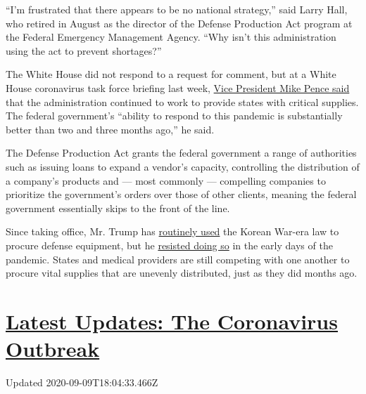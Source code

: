 ``I'm frustrated that there appears to be no national strategy,'' said
Larry Hall, who retired in August as the director of the Defense
Production Act program at the Federal Emergency Management Agency. ``Why
isn't this administration using the act to prevent shortages?''

The White House did not respond to a request for comment, but at a White
House coronavirus task force briefing last week,
\href{https://www.whitehouse.gov/briefings-statements/press-briefing-vice-president-pence-members-white-house-coronavirus-task-force-baton-rouge-la/}{Vice
President Mike Pence said} that the administration continued to work to
provide states with critical supplies. The federal government's
``ability to respond to this pandemic is substantially better than two
and three months ago,'' he said.

The Defense Production Act grants the federal government a range of
authorities such as issuing loans to expand a vendor's capacity,
controlling the distribution of a company's products and --- most
commonly --- compelling companies to prioritize the government's orders
over those of other clients, meaning the federal government essentially
skips to the front of the line.

Since taking office, Mr. Trump has
\href{https://www.nytimes3xbfgragh.onion/2020/03/31/us/politics/coronavirus-defense-production-act.html}{routinely
used} the Korean War-era law to procure defense equipment, but he
\href{https://www.nytimes3xbfgragh.onion/2020/03/20/us/politics/trump-coronavirus-supplies.html}{resisted
doing so} in the early days of the pandemic. States and medical
providers are still competing with one another to procure vital supplies
that are unevenly distributed, just as they did months ago.

\hypertarget{latest-updates-the-coronavirus-outbreak}{%
\section{\texorpdfstring{\href{https://www.nytimes3xbfgragh.onion/2020/09/09/world/covid-19-coronavirus.html?action=click\&pgtype=Article\&state=default\&region=MAIN_CONTENT_1\&context=storylines_live_updates}{Latest
Updates: The Coronavirus
Outbreak}}{Latest Updates: The Coronavirus Outbreak}}\label{latest-updates-the-coronavirus-outbreak}}

Updated 2020-09-09T18:04:33.466Z

